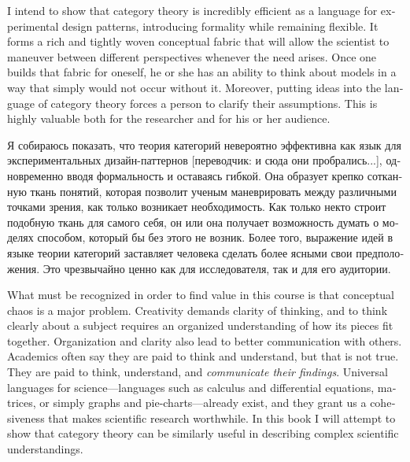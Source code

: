 \documentclass[a4paper]{book}
\theoremstyle{myth}
\begin{document}
\begin{english}
I intend to show that category theory is incredibly efficient as a language for experimental design patterns, introducing formality while remaining flexible. It forms a rich and tightly woven conceptual fabric that will allow the scientist to maneuver between different perspectives whenever the need arises. Once one builds that fabric for oneself, he or she has an ability to think about models in a way that simply would not occur without it.  Moreover, putting ideas into the language of category theory forces a person to clarify their assumptions. This is highly valuable both for the researcher and for his or her audience.

\begin{russian}Я собираюсь показать, что теория категорий невероятно эффективна как язык для экспериментальных дизайн-паттернов [переводчик: и сюда они пробрались...], одновременно вводя формальность и оставаясь гибкой. Она образует крепко сотканную ткань понятий, которая позволит ученым маневрировать между различными точками зрения, как только возникает необходимость. Как только некто строит подобную ткань для самого себя, он или она получает возможность думать о моделях способом, который бы без этого не возник. Более того, выражение идей в языке теории категорий заставляет человека сделать более ясными свои предположения. Это чрезвычайно ценно как для исследователя, так и для его аудитории. \end{russian}

What must be recognized in order to find value in this course is that conceptual chaos is a major problem. Creativity demands clarity of thinking, and to think clearly about a subject requires an organized understanding of how its pieces fit together. Organization and clarity also lead to better communication with others. Academics often say they are paid to think and understand, but that is not true. They are paid to think, understand, and {\em communicate their findings}. Universal languages for science---languages such as calculus and differential equations, matrices, or simply graphs and pie-charts---already exist, and they grant us a cohesiveness that makes scientific research worthwhile. In this book I will attempt to show that category theory can be similarly useful in describing complex scientific understandings.


\end{english}
\end{document}

